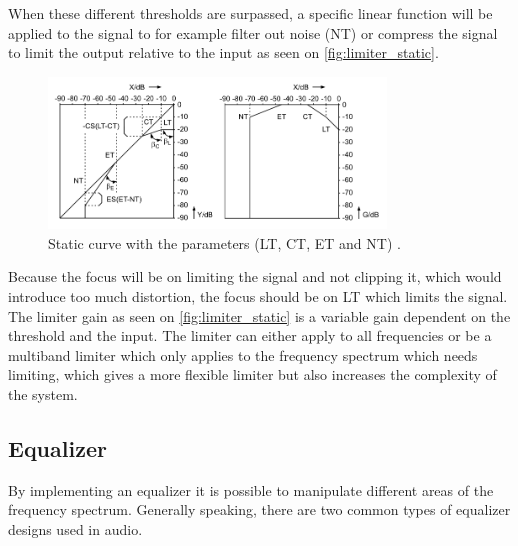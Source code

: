 When these different thresholds are surpassed, a specific linear function will be applied to the signal to for example filter out noise (NT) or compress the signal to limit the output relative to the input as seen on \autoref{fig:limiter_static}. 

\begin{figure}[H]
\centering
\includegraphics[width=0.8\textwidth]{figures/limiter_static_curve.png}
\caption{Static curve with the parameters (LT, CT, ET and NT) \citep{dynamicGainPic}.}
\label{fig:limiter_static}
\end{figure}  

Because the focus will be on limiting the signal and not clipping it, which would introduce too much distortion, the focus should be on LT which limits the signal. The limiter gain as seen on \autoref{fig:limiter_static} is a variable gain dependent on the threshold and the input. The limiter can either apply to all frequencies or be a multiband limiter which only applies to the frequency spectrum which needs limiting, which gives a more flexible limiter but also increases the complexity of the system. 

\subsection*{Equalizer}
By implementing an equalizer it is possible to manipulate different areas of the frequency spectrum. Generally speaking, there are two common types of equalizer designs used in audio.

